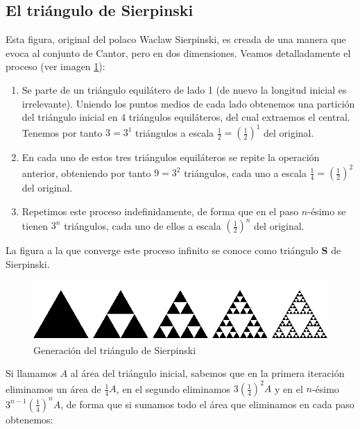 \subsection{El triángulo de Sierpinski}
\label{subsection:triangulo-Sierpinski}

Esta figura, original del polaco Waclaw Sierpinski, es creada de una manera que evoca al conjunto de Cantor, pero en dos dimensiones. Veamos detalladamente el proceso (ver imagen \ref{fig:triangulo-Sierpinski}):

\begin{enumerate}
\item Se parte de un triángulo equilátero de lado 1 (de nuevo la longitud inicial es irrelevante). Uniendo los puntos medios de cada lado obtenemos una partición del triángulo inicial en 4 triángulos equiláteros, del cual extraemos el central. Tenemos por tanto $3=3^1$ triángulos a escala $\frac 1 2 = \left(\frac 1 2\right)^1$ del original.

\item En cada uno de estos tres triángulos equiláteros se repite la operación anterior, obteniendo por tanto $9=3^2$ triángulos, cada uno a escala $\frac 1 4 = \left(\frac 1 2\right)^2$ del original.

\item Repetimos este proceso indefinidamente, de forma que en el paso $n$-ésimo se tienen $3^n$ triángulos, cada uno de ellos a escala $\left(\frac 1 2\right)^n$ del original.
\end{enumerate}

La figura a la que converge este proceso infinito se conoce como triángulo \textbf{S} de Sierpinski.

\begin{figure} [h]
\centering
\includegraphics[scale = 0.6]{img/Sierpinski-triangle.png}
\caption{Generación del triángulo de Sierpinski}
 \label{fig:triangulo-Sierpinski}
\end{figure}

Si llamamos $A$ al área del triángulo inicial, sabemos que en la primera iteración eliminamos un área de $\frac 1 4 A$, en el segundo eliminamos $3 \left(\frac 1 4\right)^2 A$ y en el $n$-ésimo $3^{n-1}\left(\frac 1 4\right)^n A$, de forma que si sumamos todo el área que eliminamos en cada paso obtenemos:

